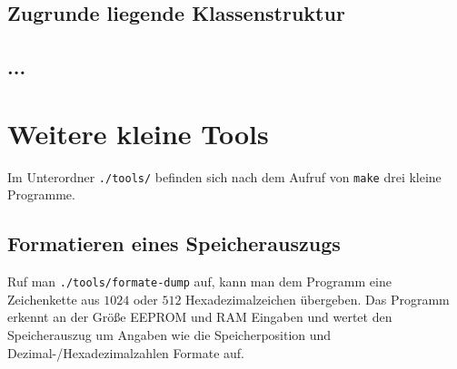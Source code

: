\subsection{Zugrunde liegende Klassenstruktur}

\subsection{...}\todo





\todo



\section{Weitere kleine Tools}\label{subsec:tools}
Im Unterordner \texttt{./tools/} befinden sich nach dem Aufruf von \texttt{make} drei kleine Programme.

\subsection{Formatieren eines Speicherauszugs}
Ruf man \texttt{./tools/formate-dump} auf, kann man dem Programm eine Zeichenkette aus $1024$ oder $512$ Hexadezimalzeichen übergeben.
Das Programm erkennt an der Größe \ac{EEPROM} und \ac{RAM} Eingaben und wertet den Speicherauszug um Angaben wie die Speicherposition und Dezimal-/Hexadezimalzahlen Formate auf.

